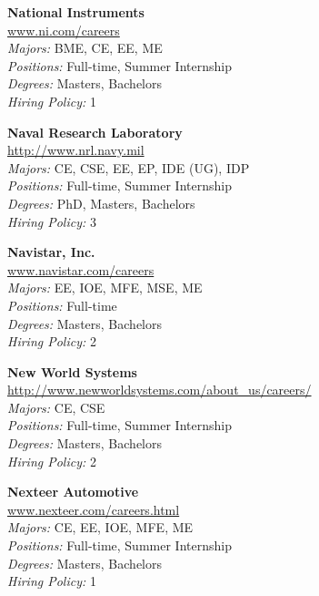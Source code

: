 \documentclass{article}
\begin{document}
\begin{center}
\begin{multicols}{3}
\begin{minipage}{.9\columnwidth}{\Large\bf National Instruments }\\
	\url{www.ni.com/careers}\\
	\emph{Majors:} BME, CE, EE, ME\\
	\emph{Positions:} Full-time, Summer Internship\\
	\emph{Degrees:} Masters, Bachelors\\
	\emph{Hiring Policy:} 1\\
\end{minipage}
 
\begin{minipage}{.9\columnwidth}{\Large\bf Naval Research Laboratory }\\
	\url{http://www.nrl.navy.mil}\\
	\emph{Majors:} CE, CSE, EE, EP, IDE (UG), IDP\\
	\emph{Positions:} Full-time, Summer Internship\\
	\emph{Degrees:} PhD, Masters, Bachelors\\
	\emph{Hiring Policy:} 3\\
\end{minipage}
 
\begin{minipage}{.9\columnwidth}{\Large\bf Navistar, Inc. }\\
	\url{www.navistar.com/careers}\\
	\emph{Majors:} EE, IOE, MFE, MSE, ME\\
	\emph{Positions:} Full-time\\
	\emph{Degrees:} Masters, Bachelors\\
	\emph{Hiring Policy:} 2\\
\end{minipage}
 
\begin{minipage}{.9\columnwidth}{\Large\bf New World Systems }\\
	\url{http://www.newworldsystems.com/about_us/careers/}\\
	\emph{Majors:} CE, CSE\\
	\emph{Positions:} Full-time, Summer Internship\\
	\emph{Degrees:} Masters, Bachelors\\
	\emph{Hiring Policy:} 2\\
\end{minipage}
 
\begin{minipage}{.9\columnwidth}{\Large\bf Nexteer Automotive }\\
	\url{www.nexteer.com/careers.html}\\
	\emph{Majors:} CE, EE, IOE, MFE, ME\\
	\emph{Positions:} Full-time, Summer Internship\\
	\emph{Degrees:} Masters, Bachelors\\
	\emph{Hiring Policy:} 1\\
\end{minipage}
 

\end{multicols}
\end{center}
\end{document}
